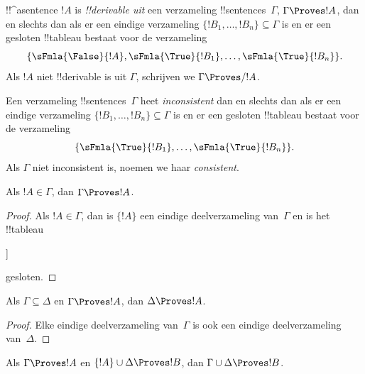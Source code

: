 \documentclass[openany]{memoir}
\begin{document}
\begin{defn}[!!^{derivability}]
!!^a{sentence} $!A$ is \emph{!!{derivable} uit} een verzameling
!!{sentence}s~$\Gamma$, $\Gamma \Proves !A$, dan en slechts dan als er
een eindige verzameling $\{!B_1, \dots, !B_n\} \subseteq \Gamma$ is
en er een gesloten !!{tableau} bestaat voor de verzameling
\[
\{
  \sFmla{\False}{!A},
  \sFmla{\True}{!B_1}, \dots,
  \sFmla{\True}{!B_n}
  \}.
\]
Als $!A$ niet !!{derivable} is uit $\Gamma$, schrijven we
$\Gamma \Proves/ !A$.
\end{defn}

\begin{defn}[Consistentie]
Een verzameling !!{sentence}s~$\Gamma$ heet \emph{inconsistent} dan en
slechts dan als er een eindige verzameling
$\{!B_1, \dots, !B_n\} \subseteq \Gamma$ is en er een gesloten
!!{tableau} bestaat voor de verzameling
\[
\{
  \sFmla{\True}{!B_1}, \dots,
  \sFmla{\True}{!B_n}  
  \}.
\]
Als $\Gamma$ niet inconsistent is, noemen we haar \emph{consistent}.
\end{defn}

\begin{prop}[Reflexiviteit]
Als $!A \in \Gamma$, dan $\Gamma \Proves !A$.
\end{prop}

\begin{proof}
Als $!A \in \Gamma$, dan is $\{!A\}$ een eindige deelverzameling
van~$\Gamma$ en is het !!{tableau}
\begin{oltableau}
  [\sFmla{\False}{\formula{A}}, just = \TAss
    [\sFmla{\True}{\formula{A}}, just = \TAss,close]
  ]
\end{oltableau}
gesloten.
\end{proof}
  

\begin{prop}[Monotoniciteit]
Als $\Gamma \subseteq \Delta$ en $\Gamma \Proves !A$, dan $\Delta
\Proves !A$.
\end{prop}

\begin{proof}
Elke eindige deelverzameling van~$\Gamma$ is ook een eindige
deelverzameling van~$\Delta$.
\end{proof}

\begin{prop}[Transitiviteit]
Als $\Gamma \Proves !A$ en $\{!A\} \cup
\Delta \Proves !B$, dan $\Gamma \cup \Delta \Proves !B$.
\end{prop}
\end{document}
